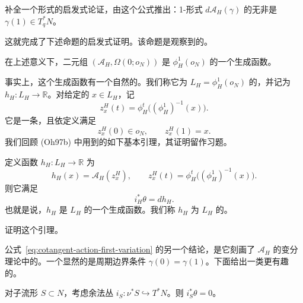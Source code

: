 \begin{exercise}
\label{ex:push-forward-action-one-form}
补全一个形式的启发式论证，由这个公式推出：1-形式 $d\mathcal A_H(\gamma)$ 的\termPushForward{}无非是 $\gamma(1)\in T_q^*N$。
\end{exercise}

这就完成了下述命题的启发式证明。该命题是\personWeinstein{}观察到的。

\begin{proposition}[\personWeinstein{}]
\label{prop:action-functional-generates-image-zero-section}
在上述意义下，二元组 $(\mathcal A_H,\Omega(0;o_N))$ 是 $\phi_H^1(o_N)$ 的一个生成函数。
\end{proposition}

事实上，这个生成函数有一个自然的\termFiniteDimensionalReduction{}。我们称它为 $L_H=\phi_H^1(o_N)$ 的\termBasicGeneratingFunction{}，并记为 $h_H:L_H\to\mathbb R$。对给定的 $x\in L_H$，记
\[
  z_x^H(t)=\phi_H^t\bigl((\phi_H^1)^{-1}(x)\bigr).
\]
它是一条\termHamiltonianTrajectory{}，且依定义满足
\begin{equation}
  z_x^H(0)\in o_N,\qquad z_x^H(1)=x.
  \label{eq:basic-hamiltonian-trajectory-endpoints}
\end{equation}
我们回顾 (Oh97b) 中用到的如下基本引理，其证明留作习题。

\begin{lemma}
\label{lem:basic-generating-function}
定义函数 $h_H:L_H\to\mathbb R$ 为
\[
  h_H(x)=\mathcal A_H(z_x^H),
  \qquad
  z_x^H(t)=\phi_H^t\bigl((\phi_H^1)^{-1}(x)\bigr).
\]
则它满足
\[
  i_H^*\theta=dh_H.
\]
也就是说，$h_H$ 是 $L_H$ 的一个生成函数。我们称 $h_H$ 为 $L_H$ 的\termBasicGeneratingFunction{}。
\end{lemma}

\begin{exercise}
\label{ex:prove-basic-generating-function}
证明这个引理。
\end{exercise}

公式~\eqref{eq:cotangent-action-first-variation} 的另一个结论，是它刻画了 $\mathcal A_H$ 的变分理论中的\termNaturalBoundaryCondition{}。一个显然的\termNaturalBoundaryCondition{}是周期边界条件 $\gamma(0)=\gamma(1)$。下面给出一类更有趣的\termNaturalBoundaryCondition{}。

\begin{proposition}
\label{prop:tautological-form-vanishes-on-conormal}
对子流形 $S\subset N$，考虑余法丛 $i_S:\nu^*S\hookrightarrow T^*N$。则 $i_S^*\theta=0$。
\end{proposition}

